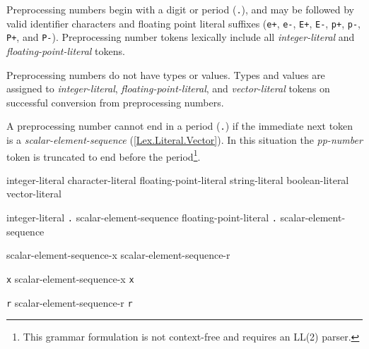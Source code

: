 \p Preprocessing numbers begin with a digit or period (\texttt{.}), and may be
followed by valid identifier characters and floating point literal suffixes
(\texttt{e+}, \texttt{e-}, \texttt{E+}, \texttt{E-}, \texttt{p+}, \texttt{p-},
\texttt{P+}, and \texttt{P-}). Preprocessing number tokens lexically include all
\textit{integer-literal} and \textit{floating-point-literal} tokens.

\p Preprocessing numbers do not have types or values. Types and values are
assigned to \textit{integer-literal}, \textit{floating-point-literal}, and
\textit{vector-literal} tokens on successful conversion from preprocessing
numbers.

\p A preprocessing number cannot end in a period (\texttt{.}) if the immediate
next token is a \textit{scalar-element-sequence} (\ref{Lex.Literal.Vector}). In
this situation the \textit{pp-number} token is truncated to end before the
period\footnote{This grammar formulation is not context-free and requires an
LL(2) parser.}.






\begin{grammar}
  \br
  integer-literal\br
  character-literal\br
  floating-point-literal\br
  string-literal\br
  boolean-literal\br
  vector-literal
\end{grammar}







\begin{grammar}
  \br
  integer-literal \texttt{.} scalar-element-sequence\br
  floating-point-literal \texttt{.} scalar-element-sequence

  \br
  scalar-element-sequence-x\br
  scalar-element-sequence-r

  \br
  \texttt{x}\br
  scalar-element-sequence-x \texttt{x}

  \br
  \texttt{r}\br
  scalar-element-sequence-r \texttt{r}
\end{grammar}

